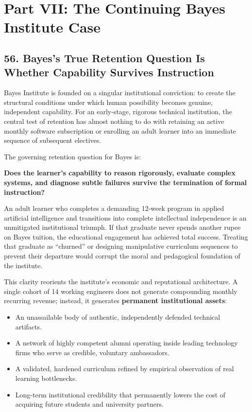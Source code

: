 \section*{Part VII: The Continuing Bayes Institute Case}

\subsection*{56. Bayes's True Retention Question Is Whether Capability Survives Instruction}

Bayes Institute is founded on a singular institutional conviction: to create the structural conditions under which human possibility becomes genuine, independent capability. For an early-stage, rigorous technical institution, the central test of retention has almost nothing to do with retaining an active monthly software subscription or enrolling an adult learner into an immediate sequence of subsequent electives.

The governing retention question for Bayes is:
\begin{center}
\textbf{Does the learner's capability to reason rigorously, evaluate complex systems, and diagnose subtle failures survive the termination of formal instruction?}
\end{center}
An adult learner who completes a demanding 12-week program in applied artificial intelligence and transitions into complete intellectual independence is an unmitigated institutional triumph. If that graduate never spends another rupee on Bayes tuition, the educational engagement has achieved total success. Treating that graduate as ``churned'' or designing manipulative curriculum sequences to prevent their departure would corrupt the moral and pedagogical foundation of the institute.

This clarity reorients the institute's economic and reputational architecture. A single cohort of 14 working engineers does not generate compounding monthly recurring revenue; instead, it generates \textbf{permanent institutional assets}:
\begin{itemize}[leftmargin=*]
\item An unassailable body of authentic, independently defended technical artifacts.
\item A network of highly competent alumni operating inside leading technology firms who serve as credible, voluntary ambassadors.
\item A validated, hardened curriculum refined by empirical observation of real learning bottlenecks.
\item Long-term institutional credibility that permanently lowers the cost of acquiring future students and university partners.
\end{itemize}

